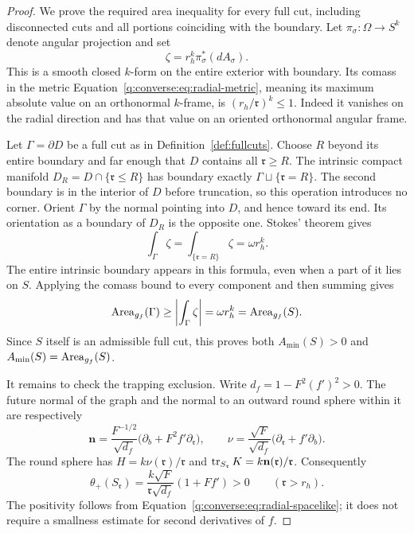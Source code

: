 \begin{proof}
We prove the required area inequality for every full cut, including
disconnected cuts and all portions coinciding with the boundary.
Let $\pi_\sigma:\Omega\to S^k$ denote angular projection and set
\[
 \zeta=r_h^k\pi_\sigma^*(dA_\sigma).
\]
This is a smooth closed $k$-form on the entire exterior with boundary.
Its comass in the metric
Equation~\eqref{q:converse:eq:radial-metric}, meaning its maximum absolute
value on an orthonormal $k$-frame, is
$(r_h/\mathfrak r)^k\le1$.  Indeed it vanishes on the radial direction
and has that value on an oriented orthonormal angular frame.

Let $\Gamma=\partial D$ be a full cut as in
Definition~\ref{def:fullcuts}.  Choose $R$ beyond its entire boundary
and far enough that $D$ contains all $\mathfrak r\ge R$.
The intrinsic compact manifold
$D_R=D\cap\{\mathfrak r\le R\}$ has boundary exactly
$\Gamma\sqcup\{\mathfrak r=R\}$.  The second boundary is in the
interior of $D$ before truncation, so this operation introduces no
corner.  Orient $\Gamma$ by the normal pointing into $D$, and hence
toward its end.  Its orientation as a boundary of $D_R$ is the
opposite one.  Stokes' theorem gives
\begin{equation}
 \int_\Gamma\zeta
 =\int_{\{\mathfrak r=R\}}\zeta
 =\omega r_h^k.
 \label{q:converse:eq:full-cut-calibration}
\end{equation}
The entire intrinsic boundary appears in this formula, even when a
part of it lies on $S$.  Applying the comass bound to every component
and then summing gives
\[
 \operatorname{Area}_{g_f}(\Gamma)
 \ge\left|\int_\Gamma\zeta\right|
 =\omega r_h^k=\operatorname{Area}_{g_f}(S).
\]
Since $S$ itself is an admissible full cut, this proves both
$A_{\min}(S)>0$ and $A_{\min}(S)=\operatorname{Area}_{g_f}(S)$.

It remains to check the trapping exclusion.  Write
$d_f=1-F^2(f')^2>0$.  The future normal of the graph and the normal
to an outward round sphere within it are respectively
\[
 \mathbf n=\frac{F^{-1/2}}{\sqrt{d_f}}
             \bigl(\partial_b+F^2f'\partial_{\mathfrak r}\bigr),
 \qquad
 \nu=\frac{\sqrt F}{\sqrt{d_f}}
             \bigl(\partial_{\mathfrak r}+f'\partial_b\bigr).
\]
The round sphere has $H=k\nu(\mathfrak r)/\mathfrak r$ and
$\operatorname{tr}_{S_{\mathfrak r}}K=k\mathbf n(\mathfrak r)/\mathfrak r$.
Consequently
\begin{equation}
 \theta_+(S_{\mathfrak r})
 =\frac{k\sqrt F}{\mathfrak r\sqrt{d_f}}(1+Ff')>0
 \qquad(\mathfrak r>r_h).
 \label{q:converse:eq:round-expansion}
\end{equation}
The positivity follows from
Equation~\eqref{q:converse:eq:radial-spacelike}; it does not require a
smallness estimate for second derivatives of $f$.


\end{proof}
